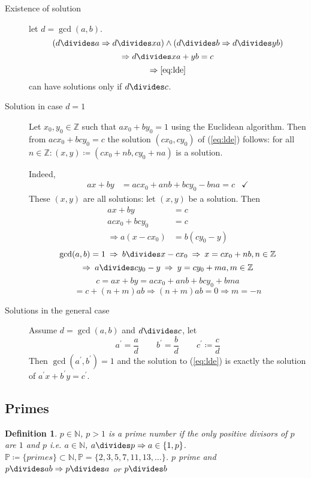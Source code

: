 \documentclass[a4paper]{article}
\newtheorem{defi}{Definition}
\newcommand{\N}{\mathbb{N}}
\newcommand{\Z}{\mathbb{Z}}
\newcommand{\PP}{\mathbb{P}}
\begin{document}
\begin{description}
  \item[Existence of solution] let $d = \gcd(a,b)$.
    \[
	    (d\divides a \Rightarrow d\divides xa) \land
	    (d\divides b \Rightarrow d\divides yb)
	\] \[
	    \Rightarrow d\divides xa+yb = c \\
	\] \[
	    \Rightarrow \cref{eq:lde}
	\]
	can have solutions only if $d\divides c$.

  \item[Solution in case $d=1$]
    Let $x_0,y_0 \in \Z$ such that $ax_0+by_0 = 1$ using the Euclidean algorithm.
    Then from $acx_0 + bcy_0 = c$ the solution $(cx_0, cy_0)$ of (\cref{eq:lde})
    follows: for all $n \in \Z: (x,y) \coloneq (cx_0+nb,cy_0+na)$ is a solution.
  
	Indeed,
	\begin{align*}
	  ax+by &= acx_0 + anb + bcy_0 - bna = c &\checkmark
	\end{align*}
    These $(x,y)$ are all solutions: let $(x,y)$ be a solution. Then
	\begin{align*}
	   ax + by &= c \\
	   acx_0 + bcy_0 &= c \\
	   \Rightarrow a(x-cx_0) &= b(cy_0-y)
	\end{align*}
	\[ \gcd(a,b) = 1 \:\Rightarrow\: b \divides x - cx_0 \:\Rightarrow\: x = cx_0 + nb, n \in \Z \]
	\[ \Rightarrow\: a \divides cy_0 - y \:\Rightarrow\: y = cy_0 + ma, m\in \Z \]
    \[ c = ax+by = acx_0 + anb + bcy_0 + bma \]
    \[ = c + (n+m)ab \Rightarrow (n+m)ab = 0 \Rightarrow m = -n \]
  
  \item[Solutions in the general case] Assume $d = \gcd(a,b)$ and $d\divides c$, let
    \[
		a^\prime = \frac{a}{d} \hspace{25pt}
		b^\prime = \frac{b}{d} \hspace{25pt}
		c^\prime \coloneq \frac{c}{d}
	\]
    Then $\gcd(a^\prime, b^\prime) = 1$ and the solution to (\cref{eq:lde}) is exactly the solution of $a^\prime x + b^\prime y = c^\prime$.
\end{description}

\subsection{Primes}

\begin{defi}
$p \in \N$, $p > 1$ is a \emph{prime number} if the only positive divisors of $p$ are $1$ and $p$ i.e. $a \in \N$, $a\divides p \Rightarrow a \in \{1,p\}$.
$\PP \coloneq \{ primes\} \subset \N, \PP = \{2,3,5,7,11,13,\dots\}$.
$p$ prime and $p\divides ab \Rightarrow p\divides a$ or $p\divides b$
\end{defi}
\end{document}
